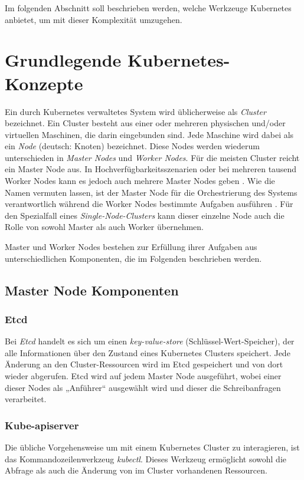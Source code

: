\documentclass[11pt,a4paper]{article}
\begin{document}
Im folgenden Abschnitt soll beschrieben werden, welche Werkzeuge Kubernetes anbietet, um mit dieser Komplexität umzugehen.

\section{Grundlegende Kubernetes-Konzepte}
\label{sec:Grundlegende_Kubernetes-Konzepte}
Ein durch Kubernetes verwaltetes System wird üblicherweise als \emph{Cluster} bezeichnet.
Ein Cluster besteht aus einer oder mehreren physischen und/oder virtuellen Maschinen, die darin eingebunden sind.
Jede Maschine wird dabei als ein \emph{Node} (deutsch: Knoten) bezeichnet. Diese Nodes werden wiederum unterschieden in 
\emph{Master Nodes} und \emph{Worker Nodes}.
Für die meisten Cluster reicht ein Master Node aus. In Hochverfügbarkeitsszenarien oder bei mehreren
tausend Worker Nodes kann es jedoch auch mehrere Master Nodes geben \cite{Schmeling_Dargatz_2022}.
Wie die Namen vermuten lassen, ist der Master Node für die Orchestrierung
des Systems verantwortlich während die Worker Nodes bestimmte Aufgaben ausführen \cite{Bentaleb_Belloum_Sebaa_El-Maouhab_2021}.
Für den Spezialfall eines \emph{Single-Node-Clusters} kann dieser einzelne Node auch die Rolle von sowohl
Master als auch Worker übernehmen.

Master und Worker Nodes bestehen zur Erfüllung ihrer Aufgaben aus unterschiedlichen Komponenten,
die im Folgenden beschrieben werden.

\subsection{Master Node Komponenten}
\subsubsection{Etcd}
Bei \emph{Etcd} handelt es sich um einen \emph{key-value-store} (Schlüssel-Wert-Speicher),
der alle Informationen über den Zustand eines Kubernetes Clusters speichert.
Jede Änderung an den Cluster-Ressourcen wird im Etcd gespeichert und von dort wieder abgerufen.
Etcd wird auf jedem Master Node ausgeführt, wobei einer dieser Nodes als „Anführer“
ausgewählt wird und dieser die Schreibanfragen verarbeitet.

\subsubsection{Kube-apiserver}
Die übliche Vorgehensweise um mit einem Kubernetes Cluster zu interagieren, ist das Kommandozeilenwerkzeug \emph{kubectl}.
Dieses Werkzeug ermöglicht sowohl die Abfrage als auch die Änderung von im Cluster vorhandenen Ressourcen.
\end{document}
